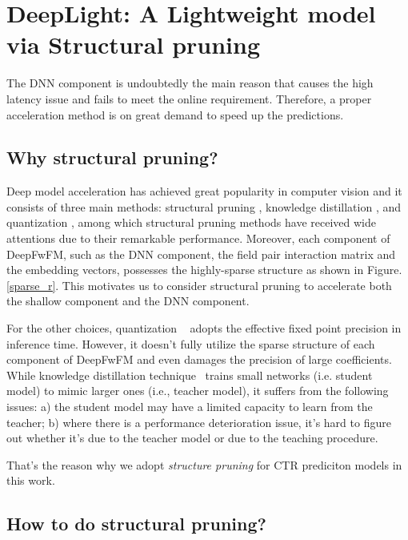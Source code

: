 \documentclass[sigconf]{acmart}
\begin{document}
\section{DeepLight: A Lightweight model via Structural pruning}

The DNN component is undoubtedly the main reason that causes the high latency issue and fails to meet the online requirement. Therefore, a proper acceleration method is on great demand to speed up the predictions. 





\subsection{Why structural pruning?}



Deep model acceleration has achieved great popularity in computer vision and it consists of three main methods: structural pruning \cite{han2015learning, li17}, knowledge distillation \cite{distill}, and quantization \cite{weight_quant1}, among which structural pruning methods have received wide attentions \cite{han2015learning, hansong16, deng2019, strucprunining, deguang, ye_icml, ye_nips} due to their remarkable performance. Moreover, each component of DeepFwFM, such as the DNN component, the field pair interaction matrix  and the embedding vectors, possesses the highly-sparse structure as shown in Figure.\ref{sparse_r}. This motivates us to consider structural pruning to accelerate both the shallow component and the DNN component.
 


For the other choices, quantization ~\cite{hansong16} adopts the effective fixed point precision in inference time. However, it doesn't fully utilize the sparse structure of each component of DeepFwFM and even damages the precision of large coefficients. While knowledge distillation technique~\cite{distill} trains small networks (i.e. student model) to mimic larger ones (i.e., teacher model), it suffers from the following issues: a) the student model may have a limited capacity to learn from the teacher; 
b) where there is a performance deterioration issue, it's hard to figure out whether it's due to the teacher model or due to the teaching procedure.

That's the reason why we adopt \emph{structure pruning} for CTR prediciton models in this work.



\subsection{How to do structural pruning?}
\end{document}

